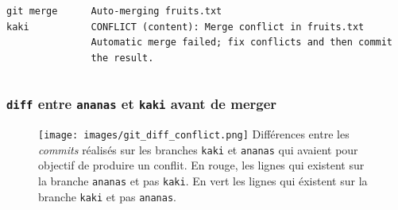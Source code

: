 \documentclass[table,tikz,12pt,svgnames]{beamer}
\begin{document}
\begin{frame}[fragile]
\begin{adjustwidth}{0.4cm}{-1cm}{}
	\begin{columns}[T] %
		\hspace{0.3cm}
		\begin{column}{.3\textwidth}
			\color{darkgreen}%
			\color{black}
			\begin{verbatim}
git merge kaki
			\end{verbatim}
		\end{column}%
		\hspace{-0.4cm}
		\begin{column}{.9\textwidth}
			\color{darkgreen}%
			\color{black}
			\vspace{-0.2em}
			\begin{verbatim}
Auto-merging fruits.txt
CONFLICT (content): Merge conflict in fruits.txt
Automatic merge failed; fix conflicts and then commit the result.
			\end{verbatim}
		\end{column}%
	\end{columns}
\end{adjustwidth}
\end{frame}


\begin{frame}
\frametitle{\texttt{diff} entre \texttt{ananas} et \texttt{kaki} avant de merger}
\begin{adjustwidth}{-0.8cm}{-0.8cm}{}
	\begin{figure}
		\centering
		\texttt{[image: images/git\_diff\_conflict.png]}
		{Différences entre les \textit{commits} réalisés sur les branches \texttt{kaki} et \texttt{ananas} qui avaient pour objectif de produire un conflit. En {\color{red}rouge}, les lignes qui existent sur la branche \texttt{ananas} et pas \texttt{kaki}. En {\color{green}vert} les lignes qui éxistent sur la branche \texttt{kaki} et pas \texttt{ananas}.}
		\label{figure:example}
	\end{figure}
\end{adjustwidth}
\end{frame}
\end{document}
